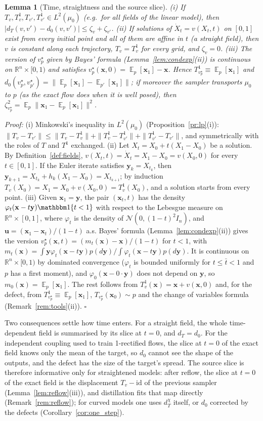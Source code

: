\documentclass{article}
\DeclareMathOperator{\E}{\mathbb{E}}
\newcommand{\RR}{\mathbb{R}}
\newcommand{\cN}{\mathcal{N}}
\newcommand{\bx}{\mathbf{x}}
\newcommand{\by}{\mathbf{y}}
\newcommand{\bu}{\mathbf{u}}
\newcommand{\vstar}{v^{\star}}
\theoremstyle{plain}
\newtheorem{lemma}[theorem]{Lemma}
\theoremstyle{remark}
\begin{document}
\begin{lemma}[Time, straightness and the source slice]\label{lem:time}
(i) If $T_v,T^1_v,T_{v'},T^1_{v'}\in L^2(\mu_0)$ (e.g.\ for all fields of the linear model), then
$|d_T(v,v')-d_0(v,v')|\le\zeta_v+\zeta_{v'}$.
(ii) If solutions of $\dot X_t=v(X_t,t)$ on $[0,1]$ exist from every initial point and all of them are
affine in $t$ (a \emph{straight} field), then $v$ is constant along each trajectory, $T_v=T^1_v$ for
every grid, and $\zeta_v=0$.
(iii) The version of $\vstar_p$ given by Bayes' formula (Lemma~\ref{lem:condexp}(ii)) is continuous on $\RR^n\times[0,1)$ and
satisfies $\vstar_p(\bx,0)=\E_p[\bx_1]-\bx$. Hence $T^1_{\vstar_p}\equiv\E_p[\bx_1]$ and
$d_0(\vstar_p,\vstar_{p'})=\|\E_p[\bx_1]-\E_{p'}[\bx_1]\|$; if moreover the sampler transports $\mu_0$ to $p$
(as the exact flow does when it is well posed), then $\zeta_{\vstar_p}^2=\E_p\|\bx_1-\E_p[\bx_1]\|^2$.
\end{lemma}
\textit{Proof:}
(i) Minkowski's inequality in $L^2(\mu_0)$ (Proposition~\ref{pr:lp}(i)): $\|T_v-T_{v'}\|\le\|T_v-T^1_v\|+\|T^1_v-T^1_{v'}\|+\|T^1_{v'}-T_{v'}\|$,
and symmetrically with the roles of $T$ and $T^1$ exchanged.
(ii) Let $X_t=X_0+t(X_1-X_0)$ be a solution. By Definition~\ref{def:fields}, $v(X_t,t)=\dot X_t=X_1-X_0=v(X_0,0)$ for every $t\in[0,1]$.
If the Euler iterate satisfies $\by_k=X_{t_k}$, then $\by_{k+1}=X_{t_k}+h_k(X_1-X_0)=X_{t_{k+1}}$; by induction
$T_v(X_0)=X_1=X_0+v(X_0,0)=T^1_v(X_0)$, and a solution starts from every point.
(iii) Given $\bx_1=\by$, the pair $(\bx_t,t)$ has the density $\varphi_t(\bx-t\by)\mathbbm 1\{t<1\}$ with respect to the Lebesgue measure on
$\RR^n\times[0,1]$, where $\varphi_t$ is the density of $\cN(0,(1-t)^2I_n)$, and $\bu=(\bx_1-\bx_t)/(1-t)$ a.s. Bayes' formula
(Lemma~\ref{lem:condexp}(ii)) gives the version $\vstar_p(\bx,t)=(m_t(\bx)-\bx)/(1-t)$ for $t<1$, with
$m_t(\bx)=\int\by\varphi_t(\bx-t\by)p(d\by)/\int\varphi_t(\bx-t\by)p(d\by)$. It is continuous on $\RR^n\times[0,1)$ by dominated convergence
($\varphi_t$ is bounded uniformly for $t\le\bar t<1$ and $p$ has a first moment), and $\varphi_0(\bx-0\cdot\by)$ does not depend on $\by$, so
$m_0(\bx)=\E_p[\bx_1]$. The rest follows from $T^1_v(\bx)=\bx+v(\bx,0)$ and, for the defect, from $T^1_{\vstar_p}\equiv\E_p[\bx_1]$,
$T_{\vstar_p}(\bx_0)\sim p$ and the change of variables formula (Remark~\ref{rem:tools}(ii)). \hfill$\square$

Two consequences settle how time enters. For a straight field, the whole time-dependent field is
summarised by its slice at $t=0$, and $d_T=d_0$. For the independent coupling used to train
1-rectified flows, the slice at $t=0$ of the exact field knows only the mean of the target, so
$d_0$ cannot see the shape of the outputs, and the defect has the size of the target's spread.
The source slice is therefore informative only for straightened models: after reflow, the slice at $t=0$ of the exact
field is the displacement $T_v-\mathrm{id}$ of the previous sampler (Lemma~\ref{lem:reflow}(iii)), and distillation fits that map directly
(Remark~\ref{rem:reflow}); for curved models one uses $d^\chi_T$ itself, or
$d_0$ corrected by the defects (Corollary~\ref{cor:one_step}).
\end{document}
